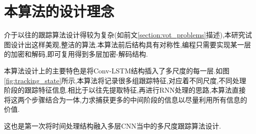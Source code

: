 \section{本算法的设计理念}
介于以往的跟踪算法设计得较为复杂(如前文\ref{section:vot_problems}描述),本研究试图设计出这样美观,整洁的算法.本算法前后结构具有对称性,编程只需要实现某一层的加密和解码,即可复用得到多层加密-解码结构.
\par
本算法设计上的主要特色是将Conv-LSTM结构插入了多尺度的每一层.如图\ref{fig:tracking_state}所示,本算法将记录很多组跟踪特征,对应着不同尺度,不同处理阶段的跟踪特征信息.相比于以往先提取特征,再进行RNN处理的思路,本算法直接将这两个步骤结合为一体,力求捕获更多的中间阶段的信息以尽量利用所有信息的价值.
\par
这也是第一次将时间处理结构融入多层CNN当中的多尺度跟踪算法设计.


